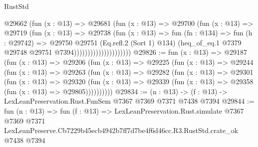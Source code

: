 \begin{lexlean}{RustStd}
\begin{coremodule}
                                @29662
                                  (fun (x : @13) =>
                                  @29681
                                    (fun (x : @13) =>
                                    @29700
                                      (fun (x : @13) =>
                                      @29719
                                        (fun (x : @13) =>
                                        @29738
                                          (fun (x : @13) =>
                                          fun (fn : @134) =>
                                          fun (h : @29742) =>
                                          @29750
                                            @29751
                                            (Eq.refl.{2} (Sort 1) @134)
                                            (heq_of_eq.{1}
                                              @7379
                                              @29748
                                              @29751
                                              @7394)))))))))))))))))))))
@29826 := fun (x : @13) =>
  @29187
    (fun (x : @13) =>
    @29206
      (fun (x : @13) =>
      @29225
        (fun (x : @13) =>
        @29244
          (fun (x : @13) =>
          @29263
            (fun (x : @13) =>
            @29282
              (fun (x : @13) =>
              @29301
                (fun (x : @13) =>
                @29320
                  (fun (x : @13) =>
                  @29339 (fun (x : @13) => @29358 (fun (x : @13) => @29805))))))))))
@29834 := (n : @13) -> (f : @13) -> LexLeanPreservation.Rust.FunSem @7367 @7369 @7371 @7438 @7394
@29844 := fun (n : @13) =>
  fun (f : @13) =>
  LexLeanPreservation.Rust.simulate
    @7367
    @7369
    @7371
    LexLeanPreserve.Cb7229b45ecb4942b7ff7d7be4f6d46cc.R3.RustStd.crate_ok
    @7438
    @7394
\end{coremodule}
\end{lexlean}
